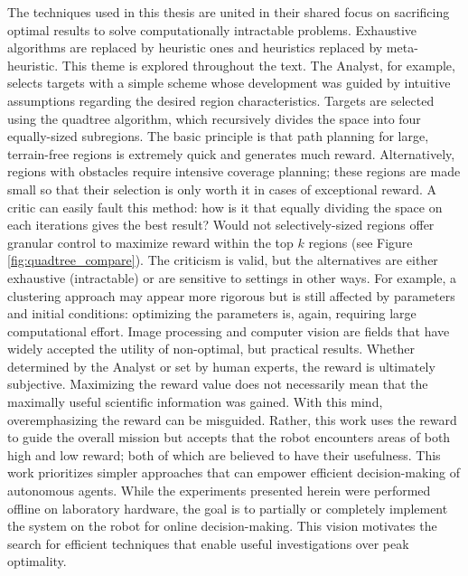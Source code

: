 \documentclass{tamuccthesis}
\begin{document}
The techniques used in this thesis are united in their shared focus on sacrificing optimal results to solve computationally intractable problems. Exhaustive algorithms are replaced by heuristic ones and heuristics replaced by meta-heuristic. This theme is explored throughout the text. The Analyst, for example, selects targets with a simple scheme whose development was guided by intuitive assumptions regarding the desired region characteristics. Targets are selected using the quadtree algorithm, which recursively divides the space into four equally-sized subregions. The basic principle is that path planning for large, terrain-free regions is extremely quick and generates much reward. Alternatively, regions with obstacles require intensive coverage planning; these regions are made small so that their selection is only worth it in cases of exceptional reward. A critic can easily fault this method: how is it that equally dividing the space on each iterations gives the best result? Would not selectively-sized regions offer granular control to maximize reward within the top $k$ regions (see Figure \ref{fig:quadtree_compare}). The criticism is valid, but the alternatives are either exhaustive (intractable) or are sensitive to settings in other ways. For example, a clustering approach may appear more rigorous but is still affected by parameters and initial conditions: optimizing the parameters is, again, requiring large computational effort. Image processing and computer vision are fields that have widely accepted the utility of non-optimal, but practical results. Whether determined by the Analyst or set by human experts, the reward is ultimately subjective. Maximizing the reward value does not necessarily mean that the maximally useful scientific information was gained. With this mind, overemphasizing the reward can be misguided. Rather, this work uses the reward to guide the overall mission but accepts that the robot encounters areas of both high and low reward; both of which are believed to have their usefulness. This work prioritizes simpler approaches that can empower efficient decision-making of autonomous agents.  While the experiments presented herein were performed offline on laboratory hardware, the goal is to partially or completely implement the system on the robot for online decision-making. This vision motivates the search for efficient techniques that enable useful investigations over peak optimality. 
\end{document}
